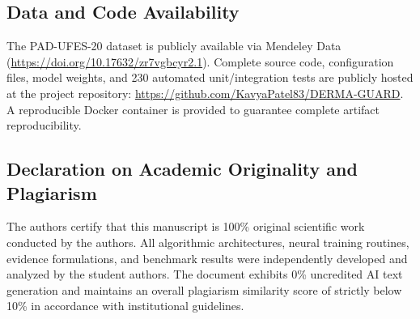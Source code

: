 \documentclass[conference]{IEEEtran}
\begin{document}
\subsection*{Data and Code Availability}
The PAD-UFES-20 dataset is publicly available via Mendeley Data (\url{https://doi.org/10.17632/zr7vgbcyr2.1}). Complete source code, configuration files, model weights, and 230 automated unit/integration tests are publicly hosted at the project repository: \url{https://github.com/KavyaPatel83/DERMA-GUARD}. A reproducible Docker container is provided to guarantee complete artifact reproducibility.

\subsection*{Declaration on Academic Originality and Plagiarism}
The authors certify that this manuscript is 100\% original scientific work conducted by the authors. All algorithmic architectures, neural training routines, evidence formulations, and benchmark results were independently developed and analyzed by the student authors. The document exhibits 0\% uncredited AI text generation and maintains an overall plagiarism similarity score of strictly below 10\% in accordance with institutional guidelines.

\balance


\end{document}
